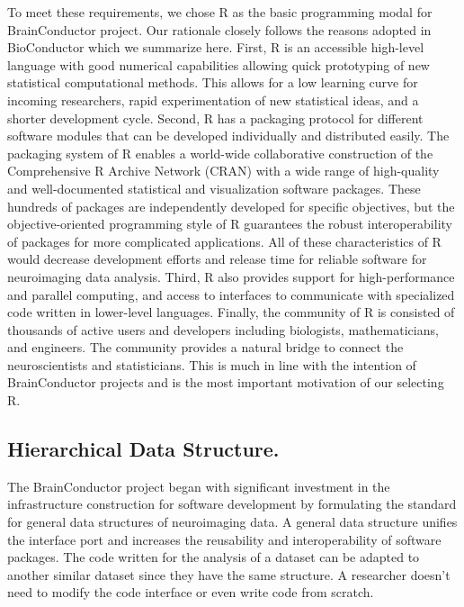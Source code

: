 \documentclass{nature}
\begin{document}
To meet these requirements, we chose R as the basic programming
modal for BrainConductor project. Our rationale closely follows
the reasons adopted in BioConductor which we summarize here\cite{gentleman2004bioconductor}.
First, R is an accessible high-level language with
good numerical capabilities allowing quick prototyping of new statistical
computational methods. This allows for a low learning curve for
incoming researchers, rapid experimentation of
new statistical ideas, and a shorter development cycle.
Second, R has a packaging protocol for different software
modules that can be developed individually and distributed easily. The
packaging system of R enables a world-wide collaborative construction of the
Comprehensive R Archive Network (CRAN) with a wide range of
high-quality and well-documented statistical and visualization software
packages. These hundreds of packages are independently developed for specific
objectives, but the objective-oriented programming style of R guarantees the
robust interoperability of packages for more complicated applications. All of
these characteristics of R would decrease development efforts and release time
for reliable software for neuroimaging data analysis. 
Third, R also provides
support for high-performance\cite{buckner2010gputools} and parallel computing\cite{schmidberger2009state}, 
and access to interfaces to communicate with specialized code
written in lower-level languages. 
Finally, the community of R is
consisted of thousands of active users and developers including biologists,
mathematicians, and engineers. The community provides a natural bridge to
connect the neuroscientists and statisticians. This is much in line with the
intention of BrainConductor projects and is the most important motivation of our
selecting R. 

 
\subsection{Hierarchical Data Structure.} The BrainConductor
project began with significant investment in the infrastructure construction for
software development by formulating the standard for general data structures of
neuroimaging data. A general data structure unifies the interface port and
increases the reusability and interoperability of software packages. The code
written for the analysis of a dataset can be adapted to another similar dataset
since they have the same structure. A researcher doesn't need to modify the code
interface or even write code from scratch. 
\end{document}
